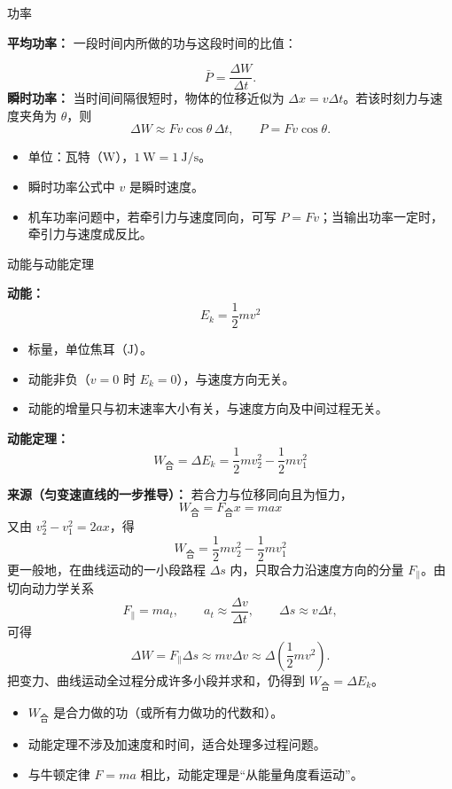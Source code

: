 \begin{conceptbox}{功率}

\textbf{平均功率：} 一段时间内所做的功与这段时间的比值：

\[
\bar P = \frac{\Delta W}{\Delta t}.
\]
\textbf{瞬时功率：} 当时间间隔很短时，物体的位移近似为
$\Delta x=v\Delta t$。若该时刻力与速度夹角为 $\theta$，则
\[
\Delta W\approx Fv\cos\theta\,\Delta t,
\qquad
\boxed{P=Fv\cos\theta}.
\]

\begin{itemize}
  \item 单位：瓦特（$\mathrm{W}$），$1\ \mathrm{W} = 1\ \mathrm{J/s}$。
  \item 瞬时功率公式中 $v$ 是瞬时速度。
  \item 机车功率问题中，若牵引力与速度同向，可写 $P = Fv$；当输出功率一定时，牵引力与速度成反比。
\end{itemize}

\end{conceptbox}

\begin{conceptbox}{动能与动能定理}

\textbf{动能：}
\[
E_k = \frac12 m v^2
\]
\begin{itemize}
  \item 标量，单位焦耳（$\mathrm{J}$）。
  \item 动能非负（$v=0$ 时 $E_k=0$），与速度方向无关。
  \item 动能的增量只与初末速率大小有关，与速度方向及中间过程无关。
\end{itemize}

\textbf{动能定理：}
\[
\boxed{W_{\text{合}} = \Delta E_k = \frac12 mv_2^2 - \frac12 mv_1^2}
\]

\textbf{来源（匀变速直线的一步推导）：}
若合力与位移同向且为恒力，
\[
W_{\text{合}} = F_{\text{合}}x = max
\]
又由 $v_2^2 - v_1^2 = 2ax$，得
\[
W_{\text{合}} = \frac12 mv_2^2 - \frac12 mv_1^2
\]
更一般地，在曲线运动的一小段路程 $\Delta s$ 内，只取合力沿速度方向的分量
$F_{\parallel}$。由切向动力学关系
\[
F_{\parallel}=ma_t,\qquad
a_t\approx\frac{\Delta v}{\Delta t},\qquad
\Delta s\approx v\Delta t,
\]
可得
\[
\Delta W=F_{\parallel}\Delta s
\approx mv\Delta v
\approx \Delta\left(\frac12mv^2\right).
\]
把变力、曲线运动全过程分成许多小段并求和，仍得到
$W_{\text{合}}=\Delta E_k$。

\begin{itemize}
  \item $W_{\text{合}}$ 是合力做的功（或所有力做功的代数和）。
  \item 动能定理不涉及加速度和时间，适合处理多过程问题。
  \item 与牛顿定律 $F = ma$ 相比，动能定理是“从能量角度看运动”。
\end{itemize}

\begin{center}


\label{fig:work-energy-theorem}
\end{center}

\end{conceptbox}

